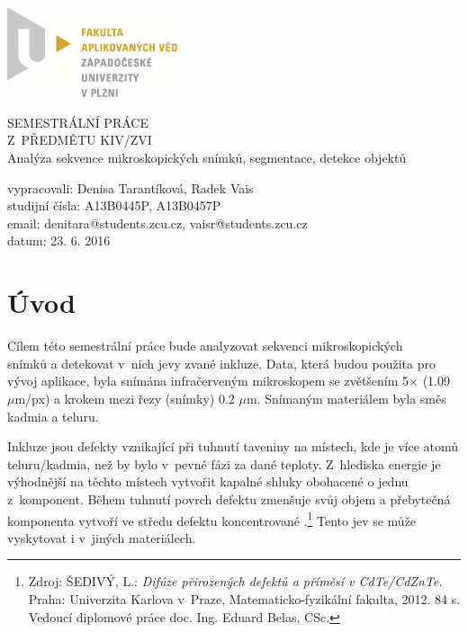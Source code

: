 \documentclass[12pt, a4paper]{report}
\begin{document}
	\begin{titlepage}
	\includegraphics[width=5cm,natwidth=601,natheight=314]{obrazky/logo.png}
		
	\vspace{4cm}
		\begin {center}
		{\Huge SEMESTRÁLNÍ PRÁCE\\ Z~PŘEDMĚTU KIV/ZVI\\}
		\vspace{1cm}
		{\huge Analýza sekvence mikroskopických snímků, segmentace, detekce objektů\\}
		\end {center}
	\vspace{6cm}
			
	\noindent vypracovali: Denisa Tarantíková, Radek Vais \\
				studijní čísla: A13B0445P, A13B0457P\\
				email:	denitara@students.zcu.cz, vaisr@students.zcu.cz\\
				datum:	23. 6. 2016
	\end{titlepage}

\tableofcontents

\chapter{Úvod}
	Cílem této semestrální práce bude analyzovat sekvenci mikroskopických \\snímků a detekovat v~nich jevy zvané inkluze. Data, která budou použita pro vývoj aplikace, byla snímána infračerveným mikroskopem se zvětšením 5$\times$ (1.09 $\mu$m/px) a krokem mezi řezy (snímky) 0.2 $\mu$m. Snímaným materiálem byla směs kadmia a teluru. 
	
	Inkluze jsou defekty vznikající při tuhnutí taveniny na místech, kde je více atomů teluru/kadmia, než by bylo v~pevné fázi za dané teploty. Z~hlediska energie je výhodnější na těchto místech vytvořit kapalné shluky obohacené o jednu z~komponent. Během tuhnutí povrch defektu zmenšuje svůj objem a přebytečná komponenta vytvoří ve středu defektu koncentrované .\footnote{	Zdroj: ŠEDIVÝ, L.: \emph{Difúze přirozených defektů a příměsí v CdTe/CdZnTe.} Praha: Univerzita Karlova v~Praze, Matematicko-fyzikální fakulta, 2012. 84 s. Vedoucí diplomové práce doc. Ing. Eduard Belas, CSc.} Tento jev se může vyskytovat i v~jiných materiálech. 
\end{document}
